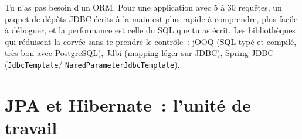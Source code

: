 \documentclass[12pt,a4paper,twoside,openright]{book}
\newcommand{\link}[2]{\href{#2}{#1}}
\begin{document}
\begin{astuce}
Tu n'as pas besoin d'un ORM. Pour une application avec 5 \`a 30 requ\^etes, un paquet de d\'ep\^ots JDBC
\'ecrits \`a la main est plus rapide \`a comprendre, plus facile \`a d\'eboguer, et la performance est celle
du SQL que tu as \'ecrit. Les biblioth\`eques qui r\'eduisent la corv\'ee sans te prendre le contr\^ole~:
\link{jOOQ}{https://www.jooq.org/} (SQL typ\'e et compil\'e, tr\`es bon avec PostgreSQL),
\link{Jdbi}{https://jdbi.org/} (mapping l\'eger sur JDBC), \link{Spring JDBC}{https://docs.spring.io/spring-framework/reference/data-access/jdbc.html}
(\verb|JdbcTemplate|/ \verb|NamedParameterJdbcTemplate|).
\end{astuce}

\section{JPA et Hibernate~: l'unit\'e de travail}
\end{document}
